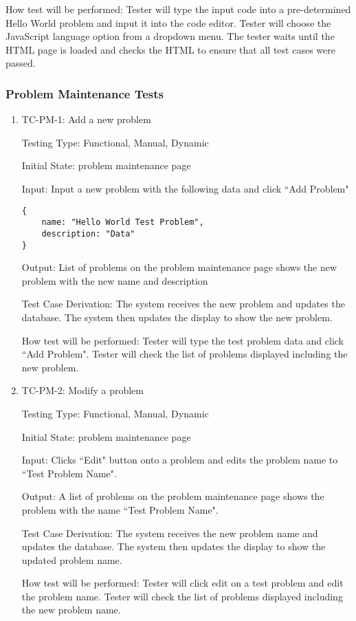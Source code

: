 \documentclass[12pt, titlepage]{article}
\begin{document}
How test will be performed: Tester will type the input code into a pre-determined Hello World problem and input it into the code editor. Tester will choose the JavaScript language option from a dropdown menu. The tester waits until the HTML page is loaded and checks the HTML to ensure that all test cases were passed.

\subsubsection{Problem Maintenance Tests}
\begin{enumerate}
\item{TC-PM-1: Add a new problem}

Testing Type: Functional, Manual, Dynamic
					
Initial State: problem maintenance page
					
Input: Input a new problem with the following data and click ``Add Problem" 
\begin{verbatim}
{
    name: "Hello World Test Problem",
    description: "Data"
}
\end{verbatim}
					
Output: List of problems on the problem maintenance page shows the new problem with the new name and description

Test Case Derivation: The system receives the new problem and updates the database. The system then updates the display to show the new problem.
					
How test will be performed: Tester will type the test problem data and click ``Add Problem". Tester will check the list of problems displayed including the new problem.

\item{TC-PM-2: Modify a problem}

Testing Type: Functional, Manual, Dynamic
					
Initial State: problem maintenance page
					
Input: Clicks ``Edit" button onto a problem and edits the problem name to ``Test Problem Name".
					
Output: A list of problems on the problem maintenance page shows the problem with the name ``Test Problem Name".

Test Case Derivation: The system receives the new problem name and updates the database. The system then updates the display to show the updated problem name.
					
How test will be performed: Tester will click edit on a test problem and edit the problem name. Tester will check the list of problems displayed including the new problem name.


\end{enumerate}
\end{document}
